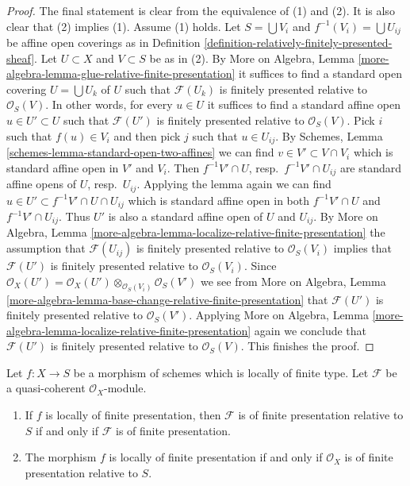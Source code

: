 \begin{proof}
The final statement is clear from the equivalence of (1) and (2).
It is also clear that (2) implies (1). Assume (1) holds.
Let $S = \bigcup V_i$ and $f^{-1}(V_i) = \bigcup U_{ij}$ be
affine open coverings as in
Definition \ref{definition-relatively-finitely-presented-sheaf}.
Let $U \subset X$ and $V \subset S$ be as in (2).
By More on Algebra, Lemma
\ref{more-algebra-lemma-glue-relative-finite-presentation}
it suffices to find a standard open covering $U = \bigcup U_k$ of $U$
such that $\mathcal{F}(U_k)$ is finitely presented relative to
$\mathcal{O}_S(V)$. In other words, for every $u \in U$ it suffices
to find a standard affine open $u \in U' \subset U$ such that
$\mathcal{F}(U')$ is finitely presented relative to $\mathcal{O}_S(V)$.
Pick $i$ such that $f(u) \in V_i$ and then pick $j$ such that
$u \in U_{ij}$. By
Schemes, Lemma \ref{schemes-lemma-standard-open-two-affines}
we can find $v \in V' \subset V \cap V_i$ which is standard affine
open in $V'$ and $V_i$. Then $f^{-1}V'  \cap U$, resp.\ $f^{-1}V' \cap U_{ij}$
are standard affine opens of $U$, resp.\ $U_{ij}$.
Applying the lemma again we can find
$u \in U' \subset f^{-1}V' \cap U \cap U_{ij}$ which is standard affine
open in both $f^{-1}V'  \cap U$ and $f^{-1}V' \cap U_{ij}$.
Thus $U'$ is also a standard affine open of $U$ and $U_{ij}$.
By More on Algebra, Lemma
\ref{more-algebra-lemma-localize-relative-finite-presentation}
the assumption that $\mathcal{F}(U_{ij})$ is finitely presented
relative to $\mathcal{O}_S(V_i)$ implies that
$\mathcal{F}(U')$ is finitely presented relative to $\mathcal{O}_S(V_i)$.
Since $\mathcal{O}_X(U') =
\mathcal{O}_X(U') \otimes_{\mathcal{O}_S(V_i)} \mathcal{O}_S(V')$
we see from More on Algebra, Lemma
\ref{more-algebra-lemma-base-change-relative-finite-presentation}
that $\mathcal{F}(U')$ is finitely presented relative to $\mathcal{O}_S(V')$.
Applying More on Algebra, Lemma
\ref{more-algebra-lemma-localize-relative-finite-presentation}
again we conclude that
$\mathcal{F}(U')$ is finitely presented relative to $\mathcal{O}_S(V)$.
This finishes the proof.
\end{proof}

\begin{lemma}
\label{lemma-relative-finite-presentation}
Let $f : X \to S$ be a morphism of schemes which is locally of finite
type. Let $\mathcal{F}$ be a quasi-coherent $\mathcal{O}_X$-module.
\begin{enumerate}
\item If $f$ is locally of finite presentation, then $\mathcal{F}$
is of finite presentation relative to $S$ if and only if $\mathcal{F}$
is of finite presentation.
\item The morphism $f$ is locally of finite presentation if and only
if $\mathcal{O}_X$ is of finite presentation relative to $S$.
\end{enumerate}
\end{lemma}

